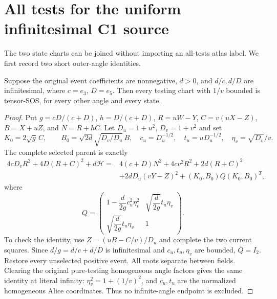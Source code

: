 \section{All tests for the uniform infinitesimal C1 source}
\label{sec:c1-uniform-all-tests}

The two state charts can be joined without importing an all-tests atlas
label. We first record two short outer-angle identities.

\begin{lemma}
Suppose the original event coefficients are nonnegative, $d>0$, and
$d/c,d/D$ are infinitesimal, where $c=e_3$, $D=e_5$.
Then every testing chart with $1/v$ bounded is tensor-SOS, for every
other angle and every state.
\end{lemma}
\begin{proof}
Put $g=cD/(c+D)$, $h=D/(c+D)$, $R=uW-Y$,
$C=v(uX-Z)$, $B=X+uZ$, and $N=R+hC$.
Let $D_u=1+u^2$, $D_v=1+v^2$ and set
\[
 K_0=2\sqrt g\,C,\qquad
 B_0=\sqrt{2d}\sqrt{D_v/D_u}\,B,\quad
 c_u=D_u^{-1/2},\quad t_u=uD_u^{-1/2},\quad
 \eta_v=\sqrt{D_v}/v.
\]
The complete selected parent is exactly
\[
\begin{split}
4cD_vR^2+4D(R+C)^2+d\mathcal H
={}&4(c+D)N^2+4cv^2R^2+2d(R+C)^2\\
 &+2dD_u(vY-Z)^2+(K_0,B_0)Q(K_0,B_0)^T,
\end{split}
\]
where
\[
 Q=\begin{pmatrix}
 1-\dfrac{d}{2g}c_u^2\eta_v^2&
 \sqrt{\dfrac{d}{2g}}t_u\eta_v\\
 \sqrt{\dfrac{d}{2g}}t_u\eta_v&1
 \end{pmatrix}.
\]
To check the identity, use $Z=(uB-C/v)/D_u$ and complete the two current
squares. Since $d/g=d/c+d/D$ is infinitesimal and $c_u,t_u,\eta_v$
are bounded, $\bar Q=I_2$. Restore every unselected positive event.
All roots separate between fields. Clearing the original pure-testing
homogeneous angle factors gives the same identity at literal infinity:
$\eta_v^2=1+(1/v)^2$, and $c_u,t_u$ are the normalized homogeneous
Alice coordinates. Thus no infinite-angle endpoint is excluded.
\end{proof}

